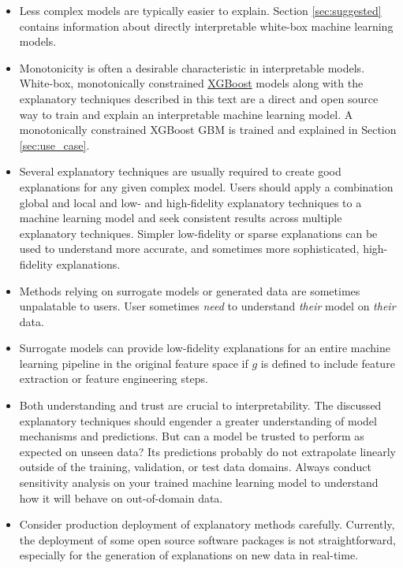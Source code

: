 \documentclass[11pt]{asaproc}
\begin{document}
\begin{itemize}	
	
	\item Less complex models are typically easier to explain. Section \ref{sec:suggested} contains information about directly interpretable white-box machine learning models.
	
	\item Monotonicity is often a desirable characteristic in interpretable models. White-box, monotonically constrained \href{https://github.com/dmlc/xgboost}{XGBoost} models along with the explanatory techniques described in this text are a direct and open source way to train and explain an interpretable machine learning model. A monotonically constrained XGBoost GBM is trained and explained in Section \ref{sec:use_case}.
	
	\item Several explanatory techniques are usually required to create good explanations for any given complex model. Users should apply a combination global and local and low- and high-fidelity explanatory techniques to a machine learning model and seek consistent results across multiple explanatory techniques. Simpler low-fidelity or sparse explanations can be used to understand more accurate, and sometimes more sophisticated, high-fidelity explanations.  

	\item Methods relying on surrogate models or generated data are sometimes unpalatable to users. User sometimes \textit{need} to understand \textit{their} model on \textit{their} data.
	
	\item Surrogate models can provide low-fidelity explanations for an entire machine learning pipeline in the original feature space if $g$ is defined to include feature extraction or feature engineering steps.
	
	\item Both understanding and trust are crucial to interpretability. The discussed explanatory techniques should engender a greater understanding of model mechanisms and predictions. But can a model be trusted to perform as expected on unseen data? Its predictions probably do not extrapolate linearly outside of the training, validation, or test data domains. Always conduct sensitivity analysis on your trained machine learning model to understand how it will behave on out-of-domain data.
	
	\item Consider production deployment of explanatory methods carefully. Currently, the deployment of some open source software packages is not straightforward, especially for the generation of explanations on new data in real-time.
	
\end{itemize}
\end{document}
